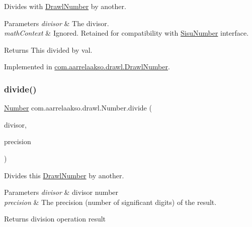 Divides with \hyperlink{classcom_1_1aarrelaakso_1_1drawl_1_1_drawl_number}{Drawl\+Number} by another. 


\begin{DoxyParams}{Parameters}
{\em divisor} & The divisor. \\
\hline
{\em math\+Context} & Ignored. Retained for compatibility with \hyperlink{classcom_1_1aarrelaakso_1_1drawl_1_1_sisu_number}{Sisu\+Number} interface. \\
\hline
\end{DoxyParams}
\begin{DoxyReturn}{Returns}
This divided by val. 
\end{DoxyReturn}


Implemented in \hyperlink{classcom_1_1aarrelaakso_1_1drawl_1_1_drawl_number_ad6350a9965757a1ffeb859d71ee0219e}{com.\+aarrelaakso.\+drawl.\+Drawl\+Number}.

\mbox{\label{interfacecom_1_1aarrelaakso_1_1drawl_1_1_number_acfcd993a82faa41956430086986084e7}} 
\subsubsection{\texorpdfstring{divide()}{divide()}\hspace{0.1cm}{\footnotesize\ttfamily [2/3]}}
{\footnotesize\ttfamily \hyperlink{interfacecom_1_1aarrelaakso_1_1drawl_1_1_number}{Number} com.\+aarrelaakso.\+drawl.\+Number.\+divide (\begin{DoxyParamCaption}\item[{@Not\+Null final \hyperlink{interfacecom_1_1aarrelaakso_1_1drawl_1_1_number}{Number}}]{divisor,  }\item[{final int}]{precision }\end{DoxyParamCaption})}



Divides this \hyperlink{classcom_1_1aarrelaakso_1_1drawl_1_1_drawl_number}{Drawl\+Number} by another. 


\begin{DoxyParams}{Parameters}
{\em divisor} & divisor number \\
\hline
{\em precision} & The precision (number of significant digits) of the result. \\
\hline
\end{DoxyParams}
\begin{DoxyReturn}{Returns}
division operation result 
\end{DoxyReturn}


